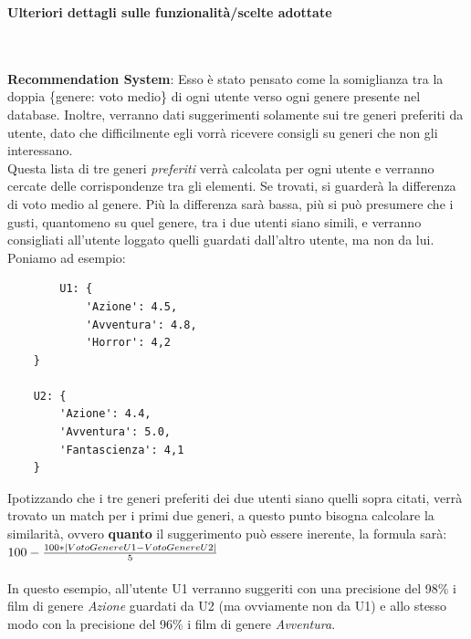 \documentclass[12pt]{article}
\begin{document}
	
	\noindent \centerline {\Huge \textbf{Ulteriori dettagli sulle funzionalità/scelte adottate}} \\ \\
	
	\noindent \textbf{Recommendation System}: Esso è stato pensato come la somiglianza tra la doppia \{genere: voto medio\} di ogni utente verso ogni genere presente nel database.
	Inoltre, verranno dati suggerimenti solamente sui tre generi preferiti da utente, dato che difficilmente egli vorrà ricevere consigli su generi che non gli interessano. \\Questa lista di tre generi \textit{preferiti} verrà calcolata per ogni utente e verranno cercate delle corrispondenze tra gli elementi. Se trovati, si guarderà la differenza di voto medio al genere. Più la differenza sarà bassa, più si può presumere che i gusti, quantomeno su quel genere, tra i due utenti siano simili, e verranno consigliati all'utente loggato quelli guardati dall'altro utente, ma non da lui. \\
	Poniamo ad esempio:
	\begin{verbatim}
		U1: {
			'Azione': 4.5,
			'Avventura': 4.8,
			'Horror': 4,2
	}

	U2: {
		'Azione': 4.4,
		'Avventura': 5.0,
		'Fantascienza': 4,1
	}
	\end{verbatim}

	\noindent Ipotizzando che i tre generi preferiti dei due utenti siano quelli sopra citati, verrà trovato un match per i primi due generi, a questo punto bisogna calcolare la similarità, ovvero \textbf{quanto} il suggerimento può essere inerente, la formula sarà: \\
	
	$100 - {100 * |VotoGenereU1-VotoGenereU2| \over 5}$ \\ \\
	
	\noindent In questo esempio, all'utente U1 verranno suggeriti con una precisione del 98\% i film di genere \textit{Azione} guardati da U2 (ma ovviamente non da U1) e allo stesso modo con la precisione del 96\% i film di genere \textit{Avventura}. \\ \\
	
\end{document}
